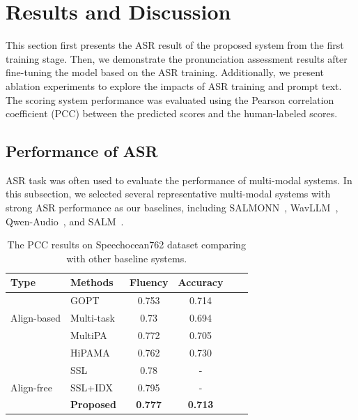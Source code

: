 \section{Results and Discussion}
This section first presents the ASR result of the proposed system from the first training stage. Then, we demonstrate the pronunciation assessment results after fine-tuning the model based on the ASR training. Additionally, we present ablation experiments to explore the impacts of ASR training and prompt text. The scoring system performance was evaluated using the Pearson correlation coefficient (PCC) between the predicted scores and the human-labeled scores.




\subsection{Performance of ASR}
ASR task was often used to evaluate the performance of multi-modal systems\cite{salmonn,wavllm,qwen_audio,salm}. In this subsection, we selected several representative multi-modal systems with strong ASR performance as our baselines, including SALMONN~\cite{salmonn}, WavLLM~\cite{wavllm}, Qwen-Audio~\cite{qwen_audio}, and SALM~\cite{salm}. 

\begin{table}[t!]
\vspace{1pt}
  \centering
  \caption{The PCC results on Speechocean762 dataset comparing with other baseline systems.}
   \label{table:main_result}
\begin{tabular}{llcccc}
\toprule
      \multicolumn{1}{l}{\textbf{Type}}   & \textbf{Methods}    & \textbf{Fluency} & \textbf{Accuracy}     \\ \midrule
       \multirow{3}{*}{Align-based}  &   GOPT~\cite{gopt}           &    0.753   &  0.714                        \\
                                    &    Multi-task~\cite{wong22_interspeech}      &  0.73          &  0.694                 \\  
                                    &   MultiPA~\cite{multipa}  &  0.772    & 0.705           \\   
                                    &   HiPAMA \cite{hipama}  &  0.762    & 0.730           \\   \midrule
       \multirow{3}{*}{Align-free}   & SSL~\cite{ssl1}  &     0.78   &  -          \\ 
                                     & SSL+IDX~\cite{liuwei}  &     0.795   &  -          \\ 
                                    &  \textbf{Proposed}   &     \textbf{0.777}   & \textbf{0.713}                 \\ 

\bottomrule

\end{tabular}
\end{table}



